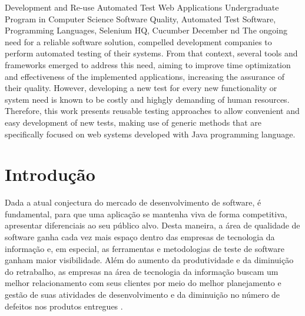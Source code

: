 \documentclass[tg]{mdtufsm}
\begin{document}
\begin{englishabstract}
{Development and Re-use Automated Test Web Applications}
{Undergraduate Program in Computer Science}
{Software Quality, Automated Test Software, Programming Languages, Selenium HQ, Cucumber}
{December}
{nd}
The ongoing need for a reliable software solution, compelled development companies to perform automated testing of their systems. From that context, several tools and frameworks emerged to address this need, aiming to improve time optimization and effectiveness of the implemented applications, increasing the assurance of their quality. However, developing a new test for every new functionality or system need is known to be costly and highgly demanding of human resources. Therefore, this work presents reusable testing approaches to allow convenient and easy development of new tests, making use of generic methods that are specifically focused on web systems developed with Java programming language.
\end{englishabstract}

\tableofcontents
\listoffigures
\listoftables

\setlength{\baselineskip}{1.5\baselineskip}


\chapter{Introdução}

Dada a atual conjectura do mercado de desenvolvimento de software, é fundamental, para
que uma aplicação se mantenha viva de forma competitiva, apresentar diferenciais ao seu público alvo. Desta maneira, a área de qualidade de software ganha cada vez mais espaço dentro das empresas de tecnologia da informação e, em especial, as ferramentas e
metodologias de teste de software ganham maior visibilidade. Além do aumento da produtividade e da diminuição do retrabalho, as empresas na área de tecnologia da informação buscam um melhor relacionamento com seus clientes por meio do melhor planejamento e gestão de suas atividades de desenvolvimento e da diminuição no número de defeitos nos produtos entregues \cite{jomori2004qualidade}.
\end{document}
